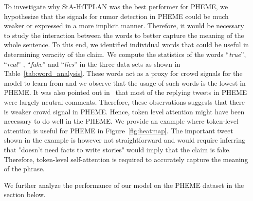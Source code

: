 \documentclass[letterpaper]{article} %
\begin{document}
To investigate why StA-HiTPLAN was the best performer for PHEME, we hypothesize that the signals for rumor detection in PHEME could be much weaker or expressed in a more implicit manner. Therefore, it would be necessary to study the interaction between the words to better capture the meaning of the whole sentence. To this end, we identified individual words that could be useful in determining veracity of the claim. We compute the statistics of the words ``{\it true}'', ``{\it real}'' , ``{\it fake}'' and ``{\it lies}'' in the three data sets as shown in Table~\ref{tab:word_analysis}. These words act as a proxy for crowd signals for the model to learn from and we observe that the usage of such words is the lowest in PHEME. It was also pointed out in~\cite{kumar19} that most of the replying tweets in PHEME were largely neutral comments. Therefore, these observations suggests that there is weaker crowd signal in PHEME. Hence, token level attention might have been necessary to do well in the PHEME. 
We provide an example where token-level attention is useful for PHEME in Figure~\ref{fig:heatmap}. The important tweet shown in the example is however not straightforward and would require inferring that "doesn't need facts to write stories" would imply that the claim is fake. Therefore, token-level self-attention is required to accurately capture the meaning of the phrase.

We further analyze the performance of our model on the PHEME dataset in the section below. 
\end{document}

